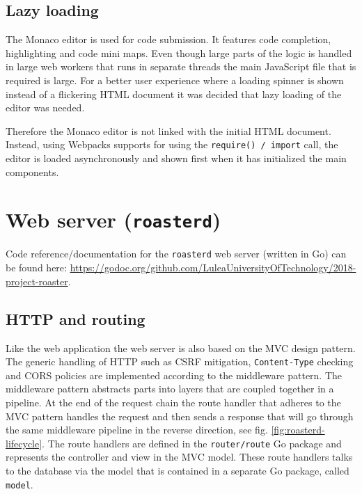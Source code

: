 \documentclass[12pt,a4paper]{report}
\begin{document}
\subsection{Lazy loading}
The Monaco editor is used for code submission. It features code completion, highlighting and code mini maps. Even though large parts of the logic is handled in large web workers that runs in separate threads the main JavaScript file that is required is large. For a better user experience where a loading spinner is shown instead of a flickering HTML document it was decided that lazy loading of the editor was needed.

Therefore the Monaco editor is not linked with the initial HTML document. Instead, using Webpacks supports for using the \texttt{require() / import} call, the editor is loaded asynchronously and shown first when it has initialized the main components.

\section{Web server (\texttt{roasterd})}
Code reference/documentation for the \texttt{roasterd} web server (written in Go) can be found here: \url{https://godoc.org/github.com/LuleaUniversityOfTechnology/2018-project-roaster}.

\subsection{HTTP and routing}
Like the web application the web server is also based on the MVC design pattern. The generic handling of HTTP such as CSRF mitigation, \texttt{Content-Type} checking and CORS policies are implemented according to the middleware pattern. The middleware pattern abstracts parts into layers that are coupled together in a pipeline. At the end of the request chain the route handler that adheres to the MVC pattern handles the request and then sends a response that will go through the same middleware pipeline in the reverse direction, see fig. \ref{fig:roasterd-lifecycle}. The route handlers are defined in the \texttt{router/route}\cite{roaster-router-route} Go package and represents the controller and view in the MVC model. These route handlers talks to the database via the model that is contained in a separate Go package, called \texttt{model}\cite{roaster-model}.
\end{document}
